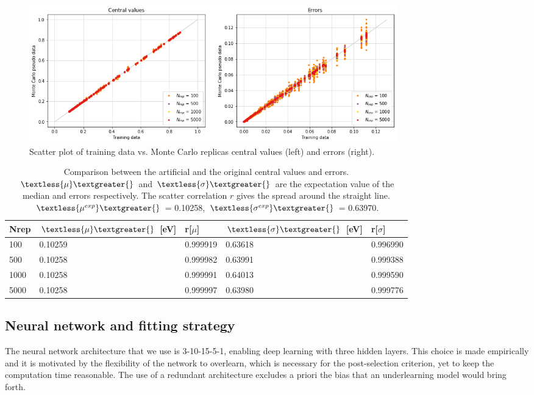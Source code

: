 \begin{figure}[H]
    \centering 
    \includegraphics[width=160mm]{plots/Montecarlovacuum.png}
    \caption{Scatter plot of training data vs. Monte Carlo replicas central values (left) and errors (right). }
    \label{mcvacuum}
\end{figure}
\begin{table}[H]
\centering
\begin{tabular}{|l|ll|ll|}
\hline
Nrep & $\textless{\mu}\textgreater{}$ {[}eV{]} & r{[}$\mu${]} & $\textless{\sigma}\textgreater{}$ {[}eV{]} & r{[}$\sigma${]} \\ \hline
100  & 0.10259                           & 0.999919   & 0.63618                                  & 0.996990      \\ \hline
500  & 0.10258                              & 0.999982   & 0.63991                                  & 0.999388      \\ \hline
1000 & 0.10258                              & 0.999991   & 0.64013                                  & 0.999590      \\ \hline
5000 & 0.10258                              & 0.999997   & 0.63980                                  & 0.999776      \\ \hline
\end{tabular}
\caption{Comparison between the artificial and the original central values and errors. $\textless{\mu}\textgreater{}$ and $\textless{\sigma}\textgreater{}$ are the expectation value of the median and errors respectively. The scatter correlation $r$ gives the spread around the straight line. $\textless{\mu^{exp}}\textgreater{}$ = 0.10258, $\textless{\sigma^{exp}}\textgreater{}$ = 0.63970. }
\label{tablemcvacuum}
\end{table}


\subsection{Neural network and fitting strategy}
The neural network architecture that we use is 3-10-15-5-1, enabling deep learning with three hidden layers. This choice is made empirically and it is motivated by the flexibility of the network to overlearn, which is necessary for the post-selection criterion, yet to keep the computation time reasonable. The use of a redundant architecture excludes a priori the bias that an underlearning model would bring forth. 

